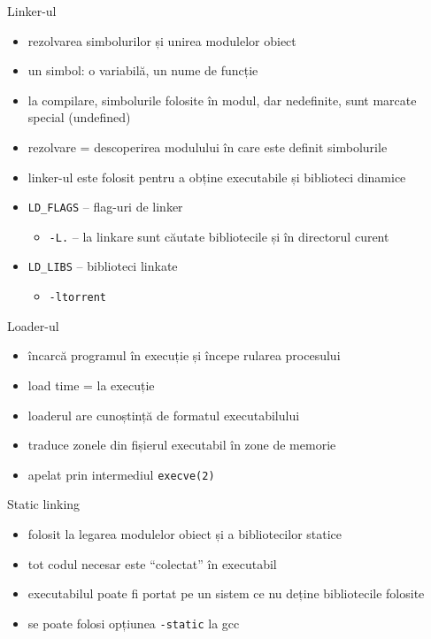 \documentclass{simple}
\begin{document}
\begin{frame}{Linker-ul}
  \begin{itemize}
    \item rezolvarea simbolurilor și unirea modulelor obiect
    \item un simbol: o variabilă, un nume de funcție
    \item la compilare, simbolurile folosite în modul, dar nedefinite, sunt
    marcate special (undefined)
    \item rezolvare = descoperirea modulului în care este definit simbolurile
    \item linker-ul este folosit pentru a obține executabile și biblioteci
    dinamice
    \item \texttt{LD\_FLAGS} -- flag-uri de linker
      \begin{itemize}
        \item \texttt{-L.} -- la linkare sunt căutate bibliotecile și în
        directorul curent
      \end{itemize}
    \item \texttt{LD\_LIBS} -- biblioteci linkate
      \begin{itemize}
        \item \texttt{-ltorrent}
      \end{itemize}
  \end{itemize}
\end{frame}

\begin{frame}{Loader-ul}
  \begin{itemize}
    \item încarcă programul în execuție și începe rularea procesului
    \item load time = la execuție
    \item loaderul are cunoștință de formatul executabilului
    \item traduce zonele din fișierul executabil în zone de memorie
    \item apelat prin intermediul \texttt{execve(2)}
  \end{itemize}
\end{frame}

\begin{frame}{Static linking}
  \begin{itemize}
    \item folosit la legarea modulelor obiect și a bibliotecilor statice
    \item tot codul necesar este ``colectat'' în executabil
    \item executabilul poate fi portat pe un sistem ce nu deține bibliotecile
    folosite
    \item se poate folosi opțiunea \texttt{-static} la gcc
  \end{itemize}
\end{frame}
\end{document}
